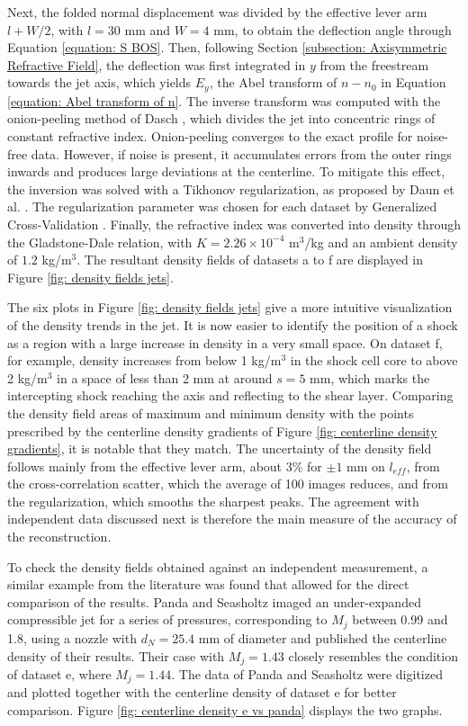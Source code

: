 Next, the folded normal displacement was divided by the effective lever arm $l + W/2$, with $l = 30$ mm and $W = 4$ mm, to obtain the deflection angle through Equation \ref{equation: S BOS}. Then, following Section \ref{subsection: Axisymmetric Refractive Field}, the deflection was first integrated in $y$ from the freestream towards the jet axis, which yields $E_y$, the Abel transform of $n - n_0$ in Equation \ref{equation: Abel transform of n}. The inverse transform was computed with the onion-peeling method of Dasch \cite{Dasch1992}, which divides the jet into concentric rings of constant refractive index. Onion-peeling converges to the exact profile for noise-free data. However, if noise is present, it accumulates errors from the outer rings inwards and produces large deviations at the centerline. To mitigate this effect, the inversion was solved with a Tikhonov regularization, as proposed by Daun et al. \cite{Daun2006}. The regularization parameter was chosen for each dataset by Generalized Cross-Validation \cite{Golub1979}. Finally, the refractive index was converted into density through the Gladstone-Dale relation, with $K = 2.26 \times 10^{-4}$ m$^3$/kg and an ambient density of $1.2$ kg/m$^3$. The resultant density fields of datasets a to f are displayed in Figure \ref{fig: density fields jets}.

The six plots in Figure \ref{fig: density fields jets} give a more intuitive visualization of the density trends in the jet. It is now easier to identify the position of a shock as a region with a large increase in density in a very small space. On dataset f, for example, density increases from below 1 kg/m$^3$ in the shock cell core to above 2 kg/m$^3$ in a space of less than 2 mm at around $s = 5$ mm, which marks the intercepting shock reaching the axis and reflecting to the shear layer. Comparing the density field areas of maximum and minimum density with the points prescribed by the centerline density gradients of Figure \ref{fig: centerline density gradients}, it is notable that they match. The uncertainty of the density field follows mainly from the effective lever arm, about 3\% for $\pm 1$ mm on $l_{eff}$, from the cross-correlation scatter, which the average of 100 images reduces, and from the regularization, which smooths the sharpest peaks. The agreement with independent data discussed next is therefore the main measure of the accuracy of the reconstruction.

To check the density fields obtained against an independent measurement, a similar example from the literature was found that allowed for the direct comparison of the results. Panda and Seasholtz \cite{Panda1999} imaged an under-expanded compressible jet for a series of pressures, corresponding to $M_j$ between 0.99 and 1.8, using a nozzle with $d_N = 25.4$ mm of diameter and published the centerline density of their results. Their case with $M_j = 1.43$ closely resembles the condition of dataset e, where $M_j = 1.44$. The data of Panda and Seasholtz were digitized and plotted together with the centerline density of dataset e for better comparison. Figure \ref{fig: centerline density e vs panda} displays the two graphs.

